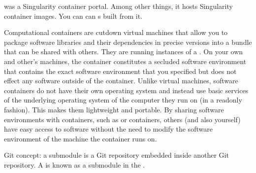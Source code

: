 \begin{description}
\sphinxAtStartPar
{} was a Singularity container portal.
Among other things, it hosts Singularity container images.
You can can  {\hyperref[\detokenize{glossary:term-container-image}]{}}s built from it.

\sphinxAtStartPar
Computational containers are cut\sphinxhyphen{}down virtual machines that allow you to package software libraries and their dependencies in precise versions into a bundle that can be shared with others.
They are running instances of a {\hyperref[\detokenize{glossary:term-container-image}]{}}.
On your own and other’s machines, the container constitutes a secluded software environment that contains the exact software environment that you specified but does not effect any software outside of the container.
Unlike virtual machines, software containers do not have their own operating system and instead use basic services of the underlying operating system of the computer they run on (in a read\sphinxhyphen{}only fashion).
This makes them lightweight and portable.
By sharing software environments with containers, such as {\hyperref[\detokenize{glossary:term-Docker}]{}} or {\hyperref[\detokenize{glossary:term-Singularity}]{}} containers, others (and also yourself) have easy access to software without the need to modify the software environment of the machine the container runs on.

\ignorespaces 
\sphinxAtStartPar
Git concept: a submodule is a Git repository embedded inside another Git repository. A
{\hyperref[\detokenize{glossary:term-DataLad-subdataset}]{}} is known as a submodule in the {\hyperref[\detokenize{glossary:term-Git-config-file}]{}}.


\end{description}
